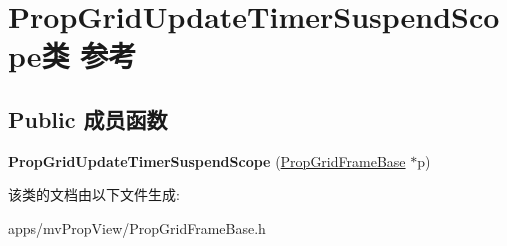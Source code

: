 \hypertarget{class_prop_grid_update_timer_suspend_scope}{\section{Prop\+Grid\+Update\+Timer\+Suspend\+Scope类 参考}
\label{class_prop_grid_update_timer_suspend_scope}
}
\subsection*{Public 成员函数}
\begin{DoxyCompactItemize}
\item 
\hypertarget{class_prop_grid_update_timer_suspend_scope_ae9b1ff1699795e404b33c2c389c06df4}{{\bfseries Prop\+Grid\+Update\+Timer\+Suspend\+Scope} (\hyperlink{class_prop_grid_frame_base}{Prop\+Grid\+Frame\+Base} $\ast$p)}\label{class_prop_grid_update_timer_suspend_scope_ae9b1ff1699795e404b33c2c389c06df4}

\end{DoxyCompactItemize}


该类的文档由以下文件生成\+:\begin{DoxyCompactItemize}
\item 
apps/mv\+Prop\+View/Prop\+Grid\+Frame\+Base.\+h\end{DoxyCompactItemize}
